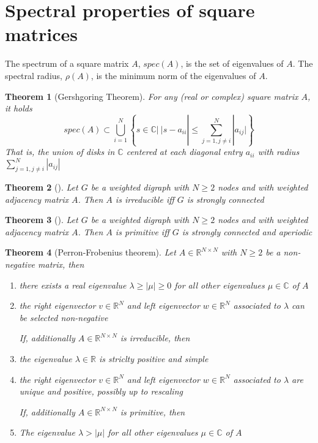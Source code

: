 \documentclass{book}
\newcommand{\R}{\mathbb{R}}
\theoremstyle{theoremv2}
\newtheorem{theorem}{Theorem}[chapter]
\theoremstyle{defv2}
\theoremstyle{remark}
\theoremstyle{remark}
\theoremstyle{definition}
\theoremstyle{definition}
\begin{document}
\section{Spectral properties of square matrices}
The spectrum of a square matrix $A$, $spec(A)$, is the set of eigenvalues of $A$. The spectral radius, $\rho(A)$, is the minimum norm of the eigenvalues of $A$.
\begin{theorem}[Gershgoring Theorem]\label{gersh}
    For any (real or complex) square matrix $A$, it holds 
    \[
        spec(A)\subset \bigcup_{i=1}^N \left\{ s\in\mathbb{C} |\ |s-a_{ii}| \leq \displaystyle\sum_{j=1, j\neq i}^{N}|a_{ij}| \right\}
    \]
    That is, the union of disks in $\mathbb{C}$ centered at each diagonal entry $a_{ii}$ with radius $\sum_{j=1,j\neq i}^{N}|a_{ij}|$
\end{theorem}
\begin{theorem}[]
    Let $G$ be a weighted digraph with $N\geq2$ nodes and with weighted adjacency matrix $A$. Then $A$ is irreducible iff $G$ is strongly connected
\end{theorem}
\begin{theorem}[]
    Let $G$ be a weighted digraph with $N\geq2$ nodes and with weighted adjacency matrix $A$. Then $A$ is primitive iff $G$ is strongly connected and aperiodic
\end{theorem}
\begin{theorem}[Perron-Frobenius theorem]
    Let $A\in\R^{N\times N}$ with $N\geq2$ be a non-negative matrix, then 
    \begin{enumerate}
        \item there exists a real eigenvalue $\lambda\geq |\mu|\geq0$ for all other eigenvalues $\mu\in\mathbb{C}$ of $A$
        \item the right eigenvector $v\in\R^N$ and left eigenvector $w\in\R^N$ associated to $\lambda$ can be selected non-negative 

            If, additionally $A\in\R^{N\times N}$ is irreducible, then 
        \item the eigenvalue $\lambda\in\R$ is striclty positive and simple
        \item the right eigenvector $v\in\R^N$ and left eigenvector $w\in\R^N$ associated to $\lambda$ are unique and positive, possibly up to rescaling

            If, additionally $A\in\R^{N\times N}$ is primitive, then
        \item The eigenvalue $\lambda>|\mu|$ for all other eigenvalues $\mu\in\mathbb{C}$ of $A$
    \end{enumerate}
\end{theorem}
\end{document}
